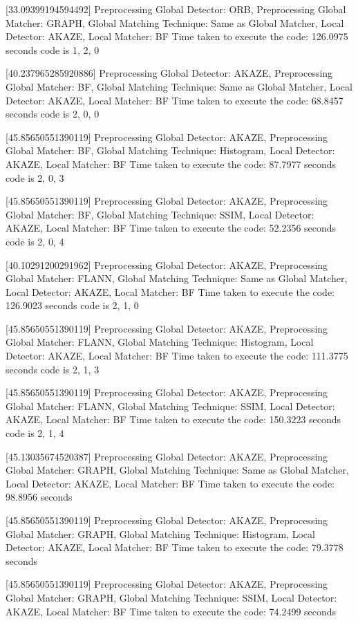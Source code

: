 [33.09399194594492]
Preprocessing Global Detector: ORB, Preprocessing Global Matcher: GRAPH, Global Matching Technique: Same as Global Matcher, Local Detector: AKAZE, Local Matcher: BF
Time taken to execute the code: 126.0975 seconds
code is 1, 2, 0


[40.237965285920886]
Preprocessing Global Detector: AKAZE, Preprocessing Global Matcher: BF, Global Matching Technique: Same as Global Matcher, Local Detector: AKAZE, Local Matcher: BF
Time taken to execute the code: 68.8457 seconds
code is 2, 0, 0


[45.85650551390119]
Preprocessing Global Detector: AKAZE, Preprocessing Global Matcher: BF, Global Matching Technique: Histogram, Local Detector: AKAZE, Local Matcher: BF
Time taken to execute the code: 87.7977 seconds
code is 2, 0, 3


[45.85650551390119]
Preprocessing Global Detector: AKAZE, Preprocessing Global Matcher: BF, Global Matching Technique: SSIM, Local Detector: AKAZE, Local Matcher: BF
Time taken to execute the code: 52.2356 seconds
code is 2, 0, 4


[40.10291200291962]
Preprocessing Global Detector: AKAZE, Preprocessing Global Matcher: FLANN, Global Matching Technique: Same as Global Matcher, Local Detector: AKAZE, Local Matcher: BF
Time taken to execute the code: 126.9023 seconds
code is 2, 1, 0


[45.85650551390119]
Preprocessing Global Detector: AKAZE, Preprocessing Global Matcher: FLANN, Global Matching Technique: Histogram, Local Detector: AKAZE, Local Matcher: BF
Time taken to execute the code: 111.3775 seconds
code is 2, 1, 3

[45.85650551390119]
Preprocessing Global Detector: AKAZE, Preprocessing Global Matcher: FLANN, Global Matching Technique: SSIM, Local Detector: AKAZE, Local Matcher: BF
Time taken to execute the code: 150.3223 seconds
code is 2, 1, 4

[45.13035674520387]
Preprocessing Global Detector: AKAZE, Preprocessing Global Matcher: GRAPH, Global Matching Technique: Same as Global Matcher, Local Detector: AKAZE, Local Matcher: BF
Time taken to execute the code: 98.8956 seconds


[45.85650551390119]
Preprocessing Global Detector: AKAZE, Preprocessing Global Matcher: GRAPH, Global Matching Technique: Histogram, Local Detector: AKAZE, Local Matcher: BF
Time taken to execute the code: 79.3778 seconds


[45.85650551390119]
Preprocessing Global Detector: AKAZE, Preprocessing Global Matcher: GRAPH, Global Matching Technique: SSIM, Local Detector: AKAZE, Local Matcher: BF
Time taken to execute the code: 74.2499 seconds






